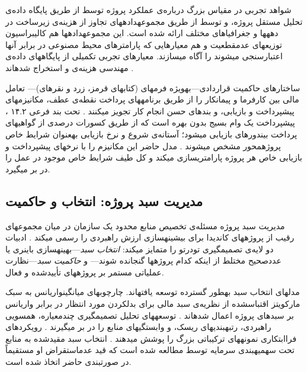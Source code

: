 شواهد تجربی در مقیاس بزرگ درباره‌ی عملکرد پروژه توسط
\citet{Merrow2011} از طریق پایگاه داده‌ی تحلیل مستقل پروژه،
و توسط \citet{Flyvbjerg2003, Flyvbjerg2018} از طریق
مجموعه\zwnj{}داده\zwnj{}های تجاوز از هزینه‌ی زیرساخت در دهه\zwnj{}ها و جغرافیاهای مختلف
ارائه شده است.
این مجموعه\zwnj{}داده\zwnj{}ها هم کالیبراسیون توزیع\zwnj{}های عدم\zwnj{}قطعیت
و هم معیارهایی که پارامترهای محیط مصنوعی در برابر آن\zwnj{}ها اعتبارسنجی می\zwnj{}شوند
را آگاه می\zwnj{}سازند.
معیارهای تجربی تکمیلی از پایگاه\zwnj{}های داده‌ی مهندسی هزینه‌ی
 و 
استخراج شده\zwnj{}اند \citep{christensen1993cost}.

ساختارهای حاکمیت قراردادی---به\zwnj{}ویژه فرم\zwnj{}های 
(کتاب\zwnj{}های قرمز، زرد و نقره\zwnj{}ای)---
تعامل مالی بین کارفرما و پیمانکار را از طریق
برنامه\zwnj{}های پرداخت نقطه‌ی عطف، مکانیزم\zwnj{}های پیش\zwnj{}پرداخت و بازیابی،
و بندهای حسن انجام کار تجویز می\zwnj{}کنند \citep{FIDIC2017}.
تحت بند فرعی ۱۴.۲ ، پیش\zwnj{}پرداخت یک وام بسیج
بدون بهره است که از طریق کسورات درصدی از گواهی\zwnj{}های پرداخت
بین\zwnj{}دوره\zwnj{}ای بازیابی می\zwnj{}شود؛
آستانه‌ی شروع و نرخ بازیابی به\zwnj{}عنوان شرایط خاص
پروژه\zwnj{}محور مشخص می\zwnj{}شوند \citep{FIDIC2017}.
مدل حاضر این مکانیزم را با نرخ\zwnj{}های پیش\zwnj{}پرداخت و بازیابی
خاص هر پروژه پارامتری\zwnj{}سازی می\zwnj{}کند و
کل طیف شرایط خاص موجود در عمل را در بر می\zwnj{}گیرد.

\subsection{مدیریت سبد پروژه: انتخاب و حاکمیت}
\label{subsec:lr_ppm}

مدیریت سبد پروژه مسئله‌ی تخصیص منابع محدود یک سازمان
در میان مجموعه\zwnj{}ای رقیب از پروژه\zwnj{}های کاندیدا
برای بیشینه\zwnj{}سازی ارزش راهبردی را رسمی می\zwnj{}کند
\citep{Archer1999, Cooper2001}.
ادبیات دو لایه‌ی تصمیم\zwnj{}گیری تودرتو را متمایز می\zwnj{}کند:
\emph{انتخاب سبد}---بهینه\zwnj{}سازی باینری یا عدد\zwnj{}صحیح مختلط
از اینکه کدام پروژه\zwnj{}ها گنجانده شوند---
و \emph{حاکمیت سبد}---نظارت عملیاتی مستمر بر پروژه\zwnj{}های تأییدشده و فعال.

مدل\zwnj{}های انتخاب سبد به\zwnj{}طور گسترده توسعه یافته\zwnj{}اند.
چارچوب\zwnj{}های میانگین\zwnj{}واریانس به سبک مارکویتز
اقتباس\zwnj{}شده از نظریه‌ی سبد مالی \citep{Markowitz1952}
برای بدل\zwnj{}کردن  مورد انتظار در برابر واریانس
بر سبدهای پروژه اعمال شده\zwnj{}اند \citep{Eilat2006}.
توسعه\zwnj{}های تحلیل تصمیم\zwnj{}گیری چندمعیاره، همسویی راهبردی،
رتبه\zwnj{}بندی\zwnj{}های ریسک، و وابستگی\zwnj{}های منابع را در بر می\zwnj{}گیرند
\citep{Martinsuo2007, Killen2008}.
رویکردهای فراابتکاری نمونه\zwnj{}های ترکیباتی بزرگ را
پوشش می\zwnj{}دهند \citep{Zhang2020}.
انتخاب سبد مقیدشده به منابع تحت سهمیه\zwnj{}بندی سرمایه توسط
\citet{kavadias2003resource} مطالعه شده است
که قید عدم\zwnj{}استقراض او مستقیماً در صورت\zwnj{}بندی حاضر اتخاذ شده است.

